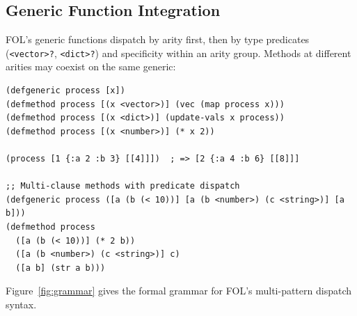 \documentclass[sigconf,nonacm,review]{acmart}
\begin{document}
\subsection{Generic Function Integration}

FOL's generic functions dispatch by arity first, then by type predicates (\texttt{<vector>?}, \texttt{<dict>?}) and specificity within an arity group. Methods at different arities may coexist on the same generic:

\begin{lstlisting}
(defgeneric process [x])
(defmethod process [(x <vector>)] (vec (map process x)))
(defmethod process [(x <dict>)] (update-vals x process))
(defmethod process [(x <number>)] (* x 2))

(process [1 {:a 2 :b 3} [[4]]])  ; => [2 {:a 4 :b 6} [[8]]]

;; Multi-clause methods with predicate dispatch
(defgeneric process ([a (b (< 10))] [a (b <number>) (c <string>)] [a b]))
(defmethod process
  ([a (b (< 10))] (* 2 b))
  ([a (b <number>) (c <string>)] c)
  ([a b] (str a b)))
\end{lstlisting}

Figure~\ref{fig:grammar} gives the formal grammar for FOL's multi-pattern dispatch syntax.
\end{document}
